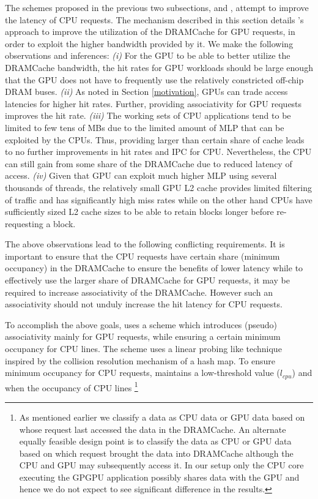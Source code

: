 The schemes proposed in the previous two subsections, \prioname and \bypassname, attempt to improve the latency of CPU requests. The mechanism described in this section details \cachename's approach to improve the utilization of the DRAMCache for GPU requests, in order to exploit the higher bandwidth provided by it. We make the following observations and inferences: \textit{(i)} For the GPU to be able to better utilize the DRAMCache bandwidth, the hit rates for GPU workloads should be large enough that the GPU does not have to frequently use the relatively constricted off-chip DRAM buses. \textit{(ii)} As noted in Section \ref{motivation}, GPUs can trade access latencies for higher hit rates. Further, providing associativity for GPU requests improves the hit rate. \textit{(iii)} The working sets of CPU applications tend to be limited to few tens of MBs due to the limited amount of MLP that can be exploited by the CPUs. Thus, providing larger than certain share of cache leads to no further improvements in hit rates and IPC for CPU. Nevertheless, the CPU can still gain from some share of the DRAMCache due to reduced latency of access. \textit{(iv)} Given that GPU can exploit much higher MLP using several thousands of threads, the relatively small GPU L2 cache provides limited filtering of traffic and has significantly high miss rates while on the other hand CPUs have sufficiently sized L2 cache sizes to be able to retain blocks longer before re-requesting a block.
\par The above observations lead to the following conflicting requirements. It is important to ensure that the CPU requests have certain share (minimum occupancy) in the DRAMCache to ensure the benefits of lower latency while to effectively use the larger share of DRAMCache for GPU requests, it may be required to increase  associativity of the DRAMCache. However such an associativity should not unduly increase the hit latency for CPU requests. 
\par To accomplish the above goals, \cachename uses a \chaining scheme which introduces (pseudo) associativity mainly for GPU requests, while ensuring a certain minimum occupancy for CPU lines. The \chaining scheme uses a linear probing like technique inspired by the collision resolution mechanism of a hash map. 
To ensure minimum occupancy for CPU requests, \chaining maintains a low-threshold value (\textit{$l_{cpu}$}) and when the occupancy of CPU lines
\footnote{As mentioned earlier we classify a data as CPU data or GPU data based on whose request last accessed the data in the DRAMCache. An alternate equally feasible design point is to classify the data as CPU or GPU data based on which request brought the data into DRAMCache although the CPU and GPU may subsequently access it. In our setup only the CPU core executing the GPGPU application possibly shares data with the GPU and hence we do not expect to see significant difference in the results.} 

